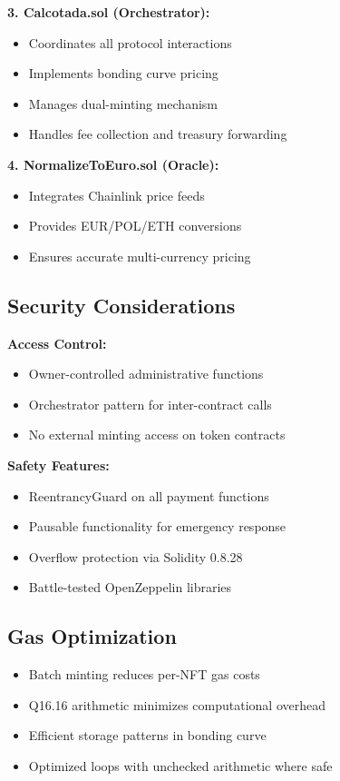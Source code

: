 \documentclass[conference]{IEEEtran}
\begin{document}
\textbf{3. Calcotada.sol (Orchestrator):}
\begin{itemize}
    \item Coordinates all protocol interactions
    \item Implements bonding curve pricing
    \item Manages dual-minting mechanism
    \item Handles fee collection and treasury forwarding
\end{itemize}

\textbf{4. NormalizeToEuro.sol (Oracle):}
\begin{itemize}
    \item Integrates Chainlink price feeds
    \item Provides EUR/POL/ETH conversions
    \item Ensures accurate multi-currency pricing
\end{itemize}

\subsection{Security Considerations}

\textbf{Access Control:}
\begin{itemize}
    \item Owner-controlled administrative functions
    \item Orchestrator pattern for inter-contract calls
    \item No external minting access on token contracts
\end{itemize}

\textbf{Safety Features:}
\begin{itemize}
    \item ReentrancyGuard on all payment functions
    \item Pausable functionality for emergency response
    \item Overflow protection via Solidity 0.8.28
    \item Battle-tested OpenZeppelin libraries
\end{itemize}

\subsection{Gas Optimization}

\begin{itemize}
    \item Batch minting reduces per-NFT gas costs
    \item Q16.16 arithmetic minimizes computational overhead
    \item Efficient storage patterns in bonding curve
    \item Optimized loops with unchecked arithmetic where safe
\end{itemize}
\end{document}
